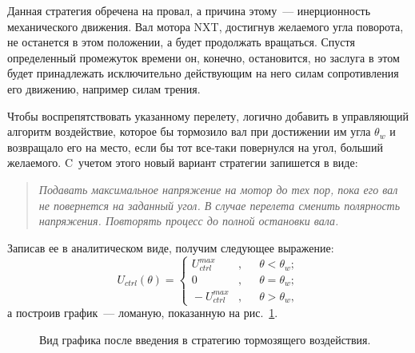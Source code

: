 \documentclass[12pt,a4paper,openany]{extarticle}
\begin{document}
Данная стратегия обречена на провал, а причина этому~--- инерционность механического движения.
Вал мотора NXT, достигнув желаемого угла поворота, не останется в этом положении, а будет продолжать вращаться.
Спустя определенный промежуток времени он, конечно, остановится, но заслуга в этом будет принадлежать исключительно действующим на него силам сопротивления его движению, например силам трения.

Чтобы воспрепятствовать указанному перелету, логично добавить в управляющий алгоритм воздействие, которое бы тормозило вал при достижении им угла $\theta_w$ и возвращало его на место, если бы тот все-таки повернулся на угол, больший желаемого.
C~учетом этого новый вариант стратегии запишется в виде:
\begin{quote}
\textsl{Подавать максимальное напряжение на мотор до тех пор, пока его вал не повернется на заданный угол.
В случае перелета сменить полярность напряжения.
Повторять процесс до полной остановки вала.} 
\end{quote}
Записав ее в аналитическом виде, получим следующее выражение:
\begin{equation}
	U_{ctrl}(\theta) = 
	\left\{
	\begin{aligned}
		\!U_{ctrl}^{max}\!&, &&\theta < \theta_w; \\
		\!0&, &&\theta = \theta_w; \\		
		\!-U_{ctrl}^{max}\!&, &&\theta > \theta_w, 
	\end{aligned}
	\right.
\end{equation}
а построив график~--- ломаную, показанную на рис.~\ref{2_graph}.

\begin{figure}[h]
	\noindent{}
	\caption{Вид графика после введения в стратегию тормозящего воздействия.}
	\label{2_graph}
\end{figure}
\end{document}
